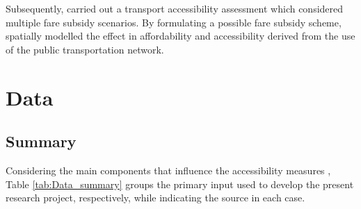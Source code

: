 \documentclass[12pt, a4paper]{report}
\begin{document}
Subsequently, \cite{guzmanAccessibilityAffordabilityEquity2018} carried out a transport accessibility assessment which considered multiple fare subsidy scenarios. By formulating a possible fare subsidy scheme, \cite{guzmanAccessibilityAffordabilityEquity2018} spatially modelled the effect in affordability and accessibility derived from the use of the public transportation network.



\chapter{Data} \label{Chap3}


\section{Summary}

Considering the main components that influence the accessibility measures \citep{pereiraIntroductionUrbanAccessibility2023a}, Table \ref{tab:Data_summary} groups the primary input used to develop the present research project, respectively, while indicating the source in each case.
\end{document}
